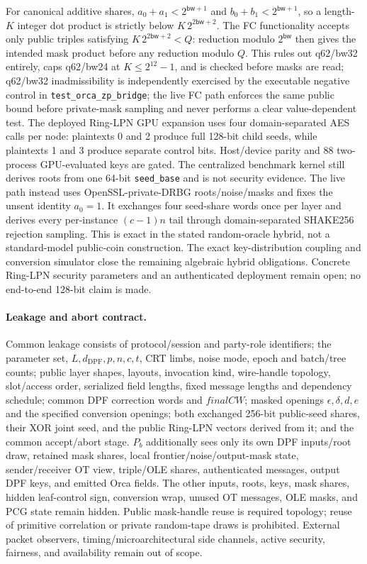 \documentclass[11pt]{article}
\newcommand{\bw}{\mathsf{bw}}
\newcommand{\dpfd}{d_{\mathrm{DPF}}} %
\begin{document}
For canonical additive shares,
$a_0+a_1<2^{\bw+1}$ and $b_0+b_1<2^{\bw+1}$, so a length-$K$
integer dot product is strictly below $K\,2^{2\bw+2}$. The FC functionality
accepts only public triples satisfying $K\,2^{2\bw+2}<Q$: reduction modulo
$2^\bw$ then gives the intended mask product before any reduction modulo $Q$.
This rules out q62/bw32 entirely, caps q62/bw24 at
$K\leq2^{12}-1$, and is checked before masks are read; q62/bw32
inadmissibility is independently exercised by the executable negative
control in \texttt{test\_orca\_zp\_bridge}; the live FC path enforces the same
public bound before private-mask sampling and never performs a clear
value-dependent test. The deployed Ring-LPN GPU expansion uses four
domain-separated AES calls per node: plaintexts 0 and 2 produce full 128-bit
child seeds, while plaintexts 1 and 3 produce separate control bits.
Host/device parity and 88 two-process GPU-evaluated keys are gated. The
centralized benchmark kernel still derives roots from one 64-bit
\texttt{seed\_base} and is not security evidence. The live path instead uses
OpenSSL-private-DRBG roots/noise/masks and fixes the unsent identity $a_0=1$.
It exchanges four seed-share words once per layer and derives every
per-instance $(c-1)n$ tail through domain-separated SHAKE256 rejection
sampling. This is exact in the stated random-oracle hybrid, not a
standard-model public-coin construction. The exact key-distribution coupling
and conversion simulator close the remaining algebraic hybrid obligations.
Concrete Ring-LPN security parameters and an authenticated deployment remain
open; no end-to-end 128-bit claim is made.

\paragraph{Leakage and abort contract.}
Common leakage consists of protocol/session and party-role identifiers; the
parameter set, $L,\dpfd,p,n,c,t$, CRT limbs, noise mode, epoch and batch/tree
counts; public layer shapes, layouts, invocation kind, wire-handle topology,
slot/access order, serialized field lengths, fixed message lengths and
dependency schedule; common DPF correction words and
$\mathit{finalCW}$; masked openings
$\epsilon,\delta,d,e$ and the specified conversion openings; both exchanged
256-bit public-seed shares, their XOR joint seed, and the public Ring-LPN
vectors derived from it; and the common accept/abort stage.
$P_b$ additionally sees only its own DPF inputs/root draw, retained mask
shares, local frontier/noise/output-mask state, sender/receiver
OT view, triple/OLE shares, authenticated messages, output DPF keys, and
emitted Orca fields. The other inputs, roots, keys, mask shares, hidden
leaf-control sign, conversion wrap, unused OT messages, OLE masks, and PCG
state remain hidden. Public mask-handle reuse is required topology; reuse of
primitive correlation or private random-tape draws is prohibited. External
packet observers, timing/microarchitectural side channels, active security,
fairness, and availability remain out of scope.
\end{document}
